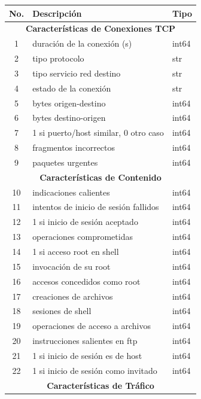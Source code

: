 \begin{table}[h!]
    \centering
    \begin{tabular}{|c|l|l|}
        \hline
        \textbf{No.} & \textbf{Descripción} & \textbf{Tipo} \\
        \hline
        \multicolumn{3}{|c|}{\textbf{Características de Conexiones TCP}} \\
        \hline
        1 & duración de la conexión (s) & int64 \\
        2 & tipo protocolo & str \\
        3 & tipo servicio red destino & str \\
        4 & estado de la conexión & str \\
        5 & bytes origen-destino & int64 \\
        6 & bytes destino-origen & int64 \\
        7 & 1 si puerto/host similar, 0 otro caso & int64 \\
        8 & fragmentos incorrectos & int64 \\
        9 & paquetes urgentes & int64 \\
        \hline
        \multicolumn{3}{|c|}{\textbf{Características de Contenido}} \\
        \hline
        10 & indicaciones calientes & int64 \\
        11 & intentos de inicio de sesión fallidos & int64 \\
        12 & 1 si inicio de sesión aceptado & int64 \\
        13 & operaciones comprometidas & int64 \\
        14 & 1 si acceso root en shell & int64 \\
        15 & invocación de su root & int64 \\
        16 & accesos concedidos como root & int64 \\
        17 & creaciones de archivos & int64 \\
        18 & sesiones de shell & int64 \\
        19 & operaciones de acceso a archivos & int64 \\
        20 & instrucciones salientes en ftp & int64 \\
        21 & 1 si inicio de sesión es de host & int64 \\
        22 & 1 si inicio de sesión como invitado & int64 \\
        \hline
        \multicolumn{3}{|c|}{\textbf{Características de Tráfico}} \\

\end{tabular}
\end{table}
